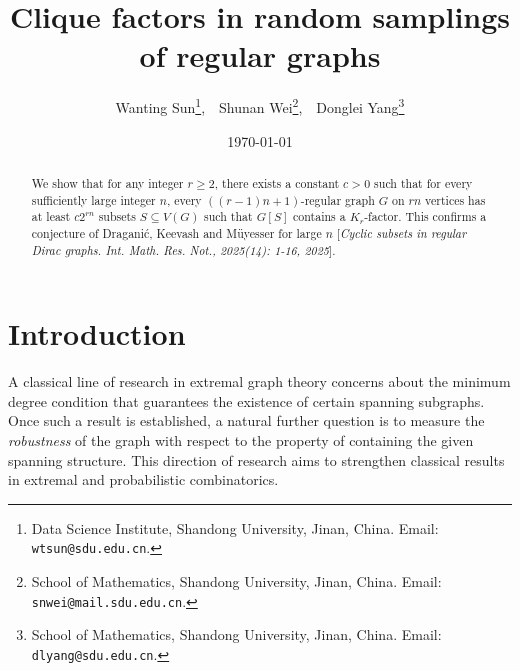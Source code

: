 \documentclass[11pt, a4paper]{article}
\title{Clique factors in random samplings of regular graphs}
\author{
Wanting Sun\thanks{Data Science Institute, Shandong University, Jinan, China. Email: {\tt wtsun@sdu.edu.cn}.},\ \ 
Shunan Wei\thanks{School of Mathematics, Shandong University, Jinan, China. Email: {\tt snwei@mail.sdu.edu.cn}.},\ \ 
Donglei Yang\thanks{School of Mathematics, Shandong University, Jinan, China. Email: {\tt dlyang@sdu.edu.cn}.}}
\date{\today}
\theoremstyle{definition}
\newcommand{\<}{\subseteq}
\begin{document}
\maketitle
\linespread{1.2}

\begin{abstract}
We show that for any integer $r\ge 2$, there exists a constant $c>0$ such that for every sufficiently large integer $n$, every $((r-1)n+1)$-regular graph $G$ on $rn$ vertices has at least $c2^{rn}$ subsets $S\subseteq V(G)$ such that $G[S]$ contains a $K_r$-factor. This confirms a conjecture of Dragani\'c, Keevash and M\"uyesser for large $n$ [\textit{Cyclic subsets in regular Dirac graphs. Int. Math. Res. Not., 2025(14): 1-16, 2025}].
\end{abstract}


\section{Introduction}
A classical line of research in extremal graph theory concerns about the  minimum degree condition that guarantees the existence of certain spanning subgraphs.   Once such a result is established,  a natural further question is to measure the \textit{robustness} of the graph with respect to the property of containing the given spanning structure. This direction of research aims to strengthen classical results in extremal and probabilistic combinatorics.
\end{document}
